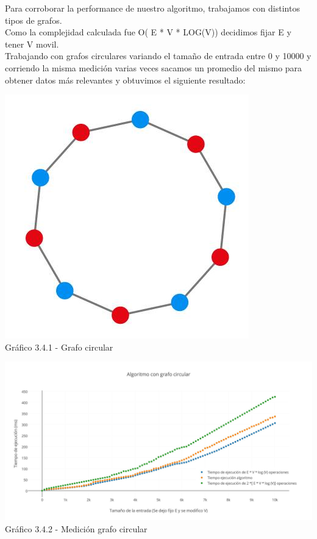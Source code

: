 \indent Para corroborar la performance de nuestro algoritmo, trabajamos con distintos tipos de grafos.\\

Como la complejidad calculada fue O( E * V * LOG(V)) decidimos fijar E y tener V movil.\\
Trabajando con grafos circulares variando el tamaño de entrada entre 0 y 10000 y corriendo la misma medición varias veces sacamos un promedio del mismo para obtener datos  más relevantes y obtuvimos el siguiente resultado:

\vspace*{0.3cm} \vspace*{0.3cm}
  \begin{center}
 \includegraphics[scale=0.5]{./ej3/circular.jpg}
 	{\\Gráfico 3.4.1 - Grafo circular}
  \end{center}
  \vspace*{0.3cm}
  
  \vspace*{0.3cm} \vspace*{0.3cm}
  \begin{center}
 \includegraphics[scale=0.28]{./ej3/circular2.jpg}
 	{Gráfico 3.4.2 - Medición grafo circular}
  \end{center}
  \vspace*{0.3cm}


